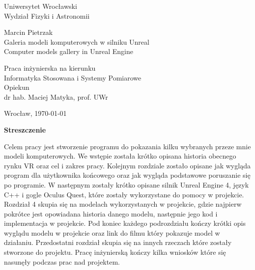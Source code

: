 \documentclass[a4paper,12pt,reqno]{article}
\begin{document}


\begin{center}

\thispagestyle{empty}

\Large 
Uniwersytet Wrocławski\\
Wydział Fizyki i Astronomii\\
\vspace{0.8cm}
\vspace{1.8cm}

\Large Marcin Pietrzak \\
\vspace{3.2cm}
\Large Galeria modeli komputerowych w silniku Unreal \\
\vspace{1.5cm}
Computer models gallery in Unreal Engine
\end{center}
\vspace{3.7cm}
\begin{flushright}

\large{ Praca inżynierska na kierunku \\Informatyka Stosowana i Systemy Pomiarowe \\}
\vspace{0.5cm}
\large{ Opiekun \\ dr hab. Maciej Matyka, prof. UWr}
\end{flushright}
\vspace{2.2cm}

\begin{center}
\large Wrocław, \today
\end{center}

\newpage

\tableofcontents

\newpage

\begin{flushleft}
\Large \textbf{Streszczenie}
\end{flushleft}
\vspace{1cm}

Celem pracy jest stworzenie programu do pokazania kilku wybranych przeze mnie modeli komputerowych. We wstępie została krótko opisana historia obecnego rynku VR oraz cel i zakres pracy. Kolejnym rozdziale zostało opisane jak wygląda program dla użytkownika końcowego oraz jak wygląda podstawowe poruszanie się po programie. W  następnym zostały krótko opisane silnik Unreal Engine 4, język C++ i gogle Oculus Quest, które zostały wykorzystane do pomocy w projekcie. Rozdział 4 skupia się na modelach wykorzystanych w projekcie, gdzie najpierw pokrótce jest opowiadana historia danego modelu, następnie jego kod i implementacja w projekcie. Pod koniec każdego podrozdziału kończy krótki opis wyglądu modelu w projekcie oraz link do filmu który pokazuje model w działaniu. Przedostatni rozdział skupia się na innych rzeczach które zostały stworzone do projektu. Pracę inżynierską kończy kilka wniosków które się nasunęły podczas prac nad projektem.
\end{document}
